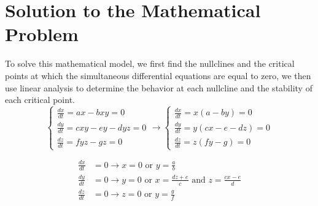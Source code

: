 \documentclass[11pt,oneside]{article}
\begin{document}
	
	\section{Solution to the Mathematical Problem}
	To solve this mathematical model, we first find the nullclines and the critical points at which the simultaneous differential equations are equal to zero, we then use linear analysis to determine the behavior at each nullcline and the stability of each critical point.
	\begin{equation}
	\begin{cases}
	\frac{dx}{dt} = ax - bxy = 0\\
	\frac{dy}{dt} = cxy - ey -dyz = 0\\
	\frac{dz}{dt} = fyz - gz = 0
	\end{cases}
	\rightarrow
	\begin{cases}
	\frac{dx}{dt} = x(a-by) = 0\\
	\frac{dy}{dt} = y(cx - e -dz) = 0\\
	\frac{dz}{dt} = z(fy - g) = 0
	\end{cases}
	\end{equation}
	
	\begin{align}
	\frac{dx}{dt} &= 0 \rightarrow x = 0 \text{ or } y = \frac{a}{b}\\
	\frac{dy}{dt} &= 0 \rightarrow y = 0 \text{ or } x = \frac{dz + e}{c} \text{ and } z = \frac{cx - e}{d}\\
	\frac{dz}{dt} &= 0 \rightarrow z = 0 \text{ or } y = \frac{g}{f}
	\end{align}
	
\end{document}
